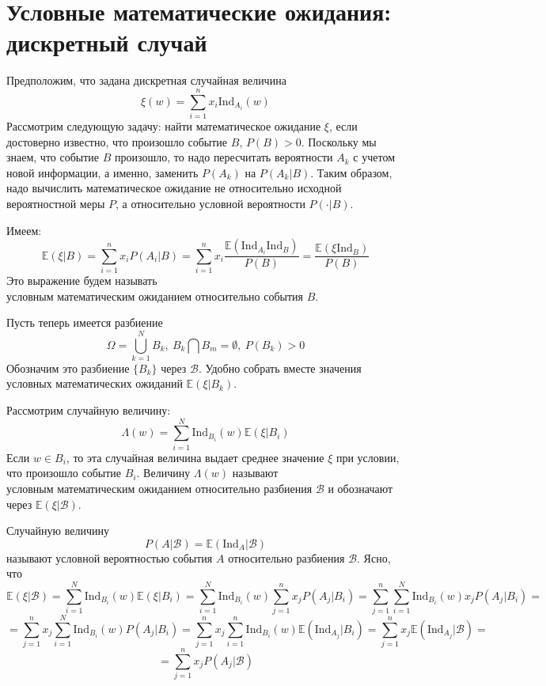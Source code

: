  \section{Условные математические ожидания: дискретный случай}

Предположим, что задана дискретная случайная величина
\[
    \xi\left(w\right) = \sum_{i = 1}^{n} x_i \text{Ind}_{A_i}\left(w\right)
\]
Рассмотрим следующую задачу: найти математическое ожидание $\xi$, если достоверно известно, что произошло событие $B$, $P\left(B\right) > 0$. Поскольку мы знаем, что событие $B$ произошло, то надо пересчитать вероятности $A_k$ с учетом новой информации, а именно, заменить $P\left(A_k\right)$ на $P\left(A_k | B\right)$. Таким образом, надо вычислить математическое ожидание не относительно исходной вероятностной меры $P$, а относительно условной вероятности $P\left(\cdot | B\right)$. 
\begin{definition}
Имеем:
\[
    \mathbb{E}\left(\xi | B\right) = \sum_{i = 1}^{n} x_i P\left(A_i | B\right) =
    \sum_{i = 1}^{n} x_i \frac{\mathbb{E} \left(\text{Ind}_{A_i} \text{Ind}_{B}\right)}{P\left(B\right)} = \frac{\mathbb{E}\left(\xi \text{Ind}_{B}\right)}{P\left(B\right)}
\]
Это выражение будем называть $\textit{условным математическим ожиданием относительно события B}$.

\end{definition}

Пусть теперь имеется разбиение 
\[
    \Omega = \bigcup_{k = 1}^{N} B_k, \ B_k \bigcap B_m = \emptyset, \ P\left(B_k\right) > 0
\]
Обозначим это разбиение $\{B_k\}$ через $\mathcal{B}$. Удобно собрать вместе значения условных математических ожиданий $\mathbb{E}\left(\xi | B_k\right)$.
\begin{definition}
Рассмотрим случайную величину: 
\[
    \Lambda\left(w\right) = \sum_{i = 1}^{N} \text{Ind}_{B_i}\left(w\right) \mathbb{E} \left(\xi | B_i\right)
\]
Если $w \in B_i$, то эта случайная величина выдает среднее значение $\xi$ при условии, что произошло событие $B_i$. Величину $\Lambda\left(w\right)$ называют $\textit{условным математическим ожиданием относительно разбиения}$ $ \mathcal{B}$ и обозначают через $\mathbb{E} \left(\xi | \mathcal{B}\right)$.
\end{definition}
Случайную величину
\[
    P\left(A | \mathcal{B}\right) = \mathbb{E}\left(\text{Ind}_A | \mathcal{B}\right)
\]
называют условной вероятностью события $A$ относительно разбиения $\mathcal{B}$. Ясно, что 
\[
    \mathbb{E}\left(\xi | \mathcal{B}\right) = \sum_{i = 1}^{N} \text{Ind}_{B_i}\left(w\right) \mathbb{E} \left(\xi | B_i\right) 
    = \sum_{i = 1}^{N} \text{Ind}_{B_i}\left(w\right) \sum_{j = 1}^{n} x_j P\left(A_j | B_i\right)
    = \sum_{j = 1}^{n} \sum_{i = 1}^{N} \text{Ind}_{B_i}\left(w\right) x_j P\left(A_j | B_i\right)
    = 
\]
\[
    = \sum_{j = 1}^{n} x_j \sum_{i = 1}^{N} \text{Ind}_{B_i}\left(w\right) P\left(A_j | B_i\right)
    = \sum_{j = 1}^{n} x_j \sum_{i = 1}^{n} \text{Ind}_{B_i}\left(w\right) \mathbb{E}\left(\text{Ind}_{A_j} | B_i\right) = \sum_{j = 1}^{n} x_j \mathbb{E} \left(\text{Ind}_{A_j} | \mathcal{B}\right)= 
\]
\[
    = \sum_{j = 1}^{n} x_j P\left(A_j | \mathcal{B}\right)
\]

